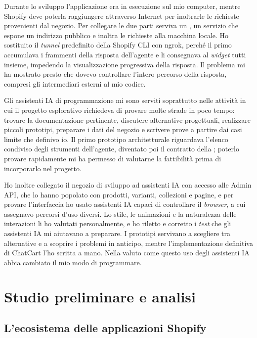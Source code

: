 Durante lo sviluppo l’applicazione era in esecuzione sul mio computer, mentre Shopify deve poterla
raggiungere attraverso Internet per inoltrarle le richieste provenienti dal negozio. Per collegare
le due parti serviva un , un servizio che espone un indirizzo pubblico
e inoltra le richieste alla macchina locale. Ho sostituito il \emph{tunnel} predefinito della
Shopify CLI con ngrok, perché il primo accumulava i frammenti della risposta dell’agente e li
consegnava al \emph{widget} tutti insieme, impedendo la visualizzazione progressiva della risposta.
Il problema mi ha mostrato presto che dovevo controllare l’intero percorso della risposta,
compresi gli intermediari esterni al mio codice.

Gli assistenti IA di programmazione mi sono serviti soprattutto nelle attività in cui il progetto
esplorativo richiedeva di provare molte strade in poco tempo: trovare la documentazione
pertinente, discutere alternative progettuali, realizzare piccoli prototipi, preparare i dati del
negozio e scrivere prove a partire dai casi limite che definivo io. Il primo prototipo
architetturale riguardava l’elenco condiviso degli strumenti dell’agente, diventato poi il
contratto della ; poterlo provare rapidamente mi ha permesso di valutarne la
fattibilità prima di incorporarlo nel progetto.

Ho inoltre collegato il negozio di sviluppo ad assistenti IA con accesso alle Admin API, che lo
hanno popolato con prodotti, varianti, collezioni e pagine, e per provare l’interfaccia ho usato
assistenti IA capaci di controllare il \emph{browser}, a cui assegnavo percorsi d’uso diversi. Lo
stile, le animazioni e la naturalezza delle interazioni li ho valutati personalmente, e ho riletto
e corretto i \emph{test} che gli assistenti IA mi aiutavano a preparare. I prototipi servivano a
scegliere tra alternative e a scoprire i problemi in anticipo, mentre l’implementazione definitiva
di ChatCart l’ho scritta a mano. Nella  valuto come questo uso degli
assistenti IA abbia cambiato il mio modo di programmare.

\section{Studio preliminare e analisi}

\subsection{L’ecosistema delle applicazioni Shopify}
\label{sec:ecosistema-applicazioni}

